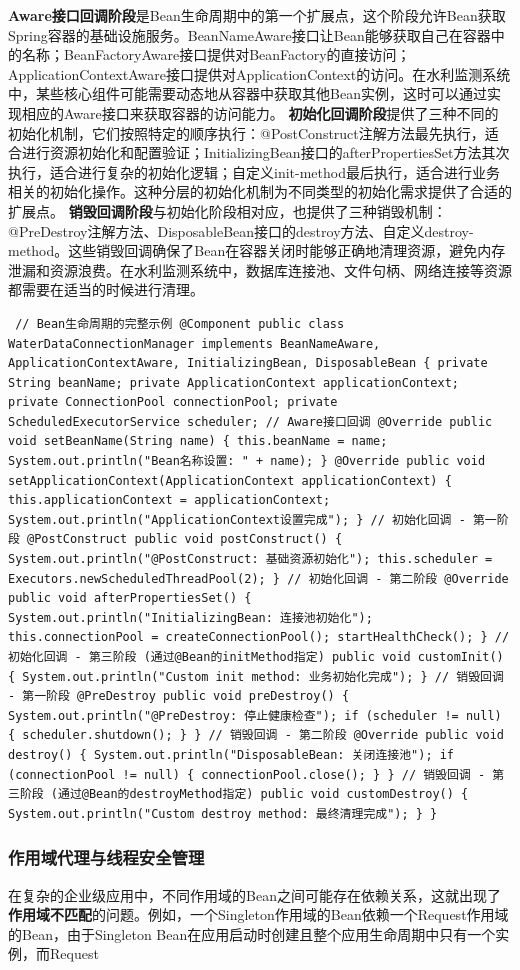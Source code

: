 \textbf{Aware接口回调阶段}是Bean生命周期中的第一个扩展点，这个阶段允许Bean获取Spring容器的基础设施服务。BeanNameAware接口让Bean能够获取自己在容器中的名称；BeanFactoryAware接口提供对BeanFactory的直接访问；ApplicationContextAware接口提供对ApplicationContext的访问。在水利监测系统中，某些核心组件可能需要动态地从容器中获取其他Bean实例，这时可以通过实现相应的Aware接口来获取容器的访问能力。 \textbf{初始化回调阶段}提供了三种不同的初始化机制，它们按照特定的顺序执行：@PostConstruct注解方法最先执行，适合进行资源初始化和配置验证；InitializingBean接口的afterPropertiesSet方法其次执行，适合进行复杂的初始化逻辑；自定义init-method最后执行，适合进行业务相关的初始化操作。这种分层的初始化机制为不同类型的初始化需求提供了合适的扩展点。 \textbf{销毁回调阶段}与初始化阶段相对应，也提供了三种销毁机制：@PreDestroy注解方法、DisposableBean接口的destroy方法、自定义destroy-method。这些销毁回调确保了Bean在容器关闭时能够正确地清理资源，避免内存泄漏和资源浪费。在水利监测系统中，数据库连接池、文件句柄、网络连接等资源都需要在适当的时候进行清理。 \begin{verbatim} // Bean生命周期的完整示例 @Component public class WaterDataConnectionManager implements BeanNameAware, ApplicationContextAware, InitializingBean, DisposableBean { private String beanName; private ApplicationContext applicationContext; private ConnectionPool connectionPool; private ScheduledExecutorService scheduler; // Aware接口回调 @Override public void setBeanName(String name) { this.beanName = name; System.out.println("Bean名称设置: " + name); } @Override public void setApplicationContext(ApplicationContext applicationContext) { this.applicationContext = applicationContext; System.out.println("ApplicationContext设置完成"); } // 初始化回调 - 第一阶段 @PostConstruct public void postConstruct() { System.out.println("@PostConstruct: 基础资源初始化"); this.scheduler = Executors.newScheduledThreadPool(2); } // 初始化回调 - 第二阶段 @Override public void afterPropertiesSet() { System.out.println("InitializingBean: 连接池初始化"); this.connectionPool = createConnectionPool(); startHealthCheck(); } // 初始化回调 - 第三阶段 (通过@Bean的initMethod指定) public void customInit() { System.out.println("Custom init method: 业务初始化完成"); } // 销毁回调 - 第一阶段 @PreDestroy public void preDestroy() { System.out.println("@PreDestroy: 停止健康检查"); if (scheduler != null) { scheduler.shutdown(); } } // 销毁回调 - 第二阶段 @Override public void destroy() { System.out.println("DisposableBean: 关闭连接池"); if (connectionPool != null) { connectionPool.close(); } } // 销毁回调 - 第三阶段 (通过@Bean的destroyMethod指定) public void customDestroy() { System.out.println("Custom destroy method: 最终清理完成"); } } \end{verbatim} \subsubsection{作用域代理与线程安全管理}\label{ux4f5cux7528ux57dfux4ee3ux7406ux4e0eux7ebfux7a0bux5b89ux5168ux7ba1ux7406} 在复杂的企业级应用中，不同作用域的Bean之间可能存在依赖关系，这就出现了\textbf{作用域不匹配}的问题。例如，一个Singleton作用域的Bean依赖一个Request作用域的Bean，由于Singleton Bean在应用启动时创建且整个应用生命周期中只有一个实例，而Request 